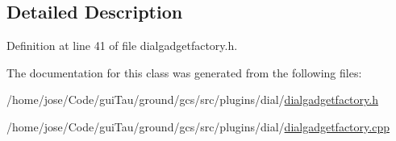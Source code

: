 \subsection{Detailed Description}


Definition at line 41 of file dialgadgetfactory.\-h.



The documentation for this class was generated from the following files\-:\begin{DoxyCompactItemize}
\item 
/home/jose/\-Code/gui\-Tau/ground/gcs/src/plugins/dial/\hyperlink{dialgadgetfactory_8h}{dialgadgetfactory.\-h}\item 
/home/jose/\-Code/gui\-Tau/ground/gcs/src/plugins/dial/\hyperlink{dialgadgetfactory_8cpp}{dialgadgetfactory.\-cpp}\end{DoxyCompactItemize}
